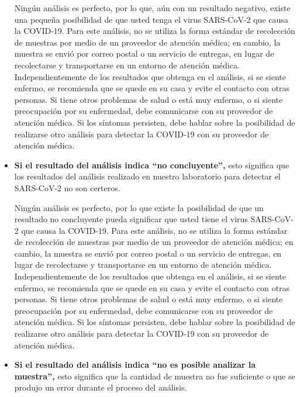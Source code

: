 \documentclass[10pt]{article}
\begin{document}
\begin{itemize}
{  Ningún análisis es perfecto, por lo que, aún con un resultado negativo, existe
  una pequeña posibilidad de que usted tenga el virus SARS-CoV-2 que causa la
  COVID-19. Para este análisis, no se utiliza la forma estándar de recolección
  de muestras por medio de un proveedor de atención médica; en cambio, la
  muestra se envió por correo postal o un servicio de entregas, en lugar de
  recolectarse y transportarse en un entorno de atención médica.
  Independientemente de los resultados que obtenga en el análisis, si se siente
  enfermo, se recomienda que se quede en su casa y evite el contacto con otras
  personas. Si tiene otros problemas de salud o está muy enfermo, o si siente
  preocupación por su enfermedad, debe comunicarse con su proveedor de atención
  médica. Si los síntomas persisten, debe hablar sobre la posibilidad de
  realizarse otro análisis para detectar la COVID-19 con su proveedor de
  atención médica.
}

\item

  \textbf{Si el resultado del análisis indica ``no concluyente'',} esto
  significa que los resultados del análisis realizado en nuestro laboratorio
  para detectar el SARS-CoV-2 no son certeros.

  Ningún análisis es perfecto, por lo que existe la posibilidad de que un
  resultado no concluyente pueda significar que usted tiene el virus SARS-CoV-2
  que causa la COVID-19. Para este análisis, no se utiliza la forma estándar de
  recolección de muestras por medio de un proveedor de atención médica; en
  cambio, la muestra se envió por correo postal o un servicio de entregas, en
  lugar de recolectarse y transportarse en un entorno de atención médica.
  Independientemente de los resultados que obtenga en el análisis, si se siente
  enfermo, se recomienda que se quede en su casa y evite el contacto con otras
  personas. Si tiene otros problemas de salud o está muy enfermo, o si siente
  preocupación por su enfermedad, debe comunicarse con su proveedor de atención
  médica. Si los síntomas persisten, debe hablar sobre la posibilidad de
  realizarse otro análisis para detectar la COVID-19 con su proveedor de
  atención médica.

\item

  \textbf{Si el resultado del análisis indica ``no es posible analizar la
  muestra'',} esto significa que la cantidad de muestra no fue suficiente o que
  se produjo un error durante el proceso del análisis.


\end{itemize}
\end{document}
